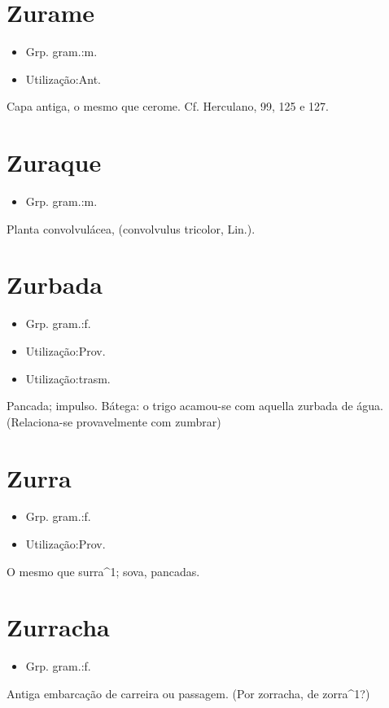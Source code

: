 \section{Zurame}
\begin{itemize}
\item {Grp. gram.:m.}
\end{itemize}
\begin{itemize}
\item {Utilização:Ant.}
\end{itemize}
Capa antiga, o mesmo que \textunderscore cerome\textunderscore . Cf. Herculano, 99, 125 e 127.
\section{Zuraque}
\begin{itemize}
\item {Grp. gram.:m.}
\end{itemize}
Planta convolvulácea, (\textunderscore convolvulus tricolor\textunderscore , Lin.).
\section{Zurbada}
\begin{itemize}
\item {Grp. gram.:f.}
\end{itemize}
\begin{itemize}
\item {Utilização:Prov.}
\end{itemize}
\begin{itemize}
\item {Utilização:trasm.}
\end{itemize}
Pancada; impulso.
Bátega: \textunderscore o trigo acamou-se com aquella zurbada de água\textunderscore .
(Relaciona-se provavelmente com \textunderscore zumbrar\textunderscore )
\section{Zurra}
\begin{itemize}
\item {Grp. gram.:f.}
\end{itemize}
\begin{itemize}
\item {Utilização:Prov.}
\end{itemize}
O mesmo que \textunderscore surra\textunderscore ^1; sova, pancadas.
\section{Zurracha}
\begin{itemize}
\item {Grp. gram.:f.}
\end{itemize}
Antiga embarcação de carreira ou passagem.
(Por \textunderscore zorracha\textunderscore , de \textunderscore zorra\textunderscore ^1?)
